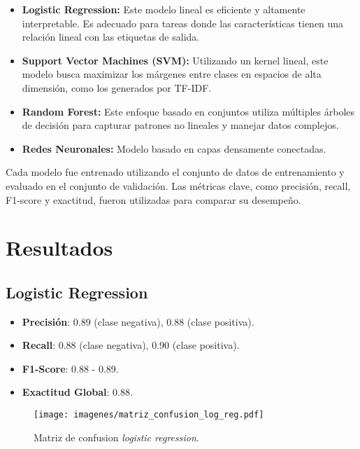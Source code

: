 \documentclass[conference]{IEEEtran}
\begin{document}
\begin{itemize}
    \item \textbf{Logistic Regression:} Este modelo lineal es eficiente y altamente interpretable. Es adecuado para tareas donde las características tienen una relación lineal con las etiquetas de salida.
    
    \item \textbf{Support Vector Machines (SVM):} Utilizando un kernel lineal, este modelo busca maximizar los márgenes entre clases en espacios de alta dimensión, como los generados por TF-IDF.
    
    \item \textbf{Random Forest:} Este enfoque basado en conjuntos utiliza múltiples árboles de decisión para capturar patrones no lineales y manejar datos complejos.

	\item \textbf{Redes Neuronales:} Modelo basado en capas densamente conectadas.    
    
\end{itemize}

Cada modelo fue entrenado utilizando el conjunto de datos de entrenamiento y evaluado en el conjunto de validación. Las métricas clave, como precisión, recall, F1-score y exactitud, fueron utilizadas para comparar su desempeño.



\section{Resultados}

\subsection*{Logistic Regression}

\begin{itemize}
\item \textbf{Precisión}: 0.89 (clase negativa), 0.88 (clase positiva).
\item \textbf{Recall}: 0.88 (clase negativa), 0.90 (clase positiva).
\item \textbf{F1-Score}: 0.88 - 0.89.
\item \textbf{Exactitud Global}: 0.88.
\end{itemize}

\begin{figure}[h]
    \centering
    \texttt{[image: imagenes/matriz\_confusion\_log\_reg.pdf]}
    \caption{Matriz de confusion \textit{logistic regression}.}
    \label{fig:log_reg}
\end{figure}
\end{document}
